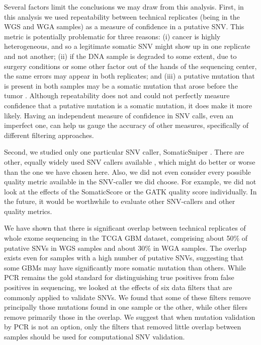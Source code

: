\documentclass[11pt]{article} %
\begin{document}
Several factors limit the conclusions we may draw from this analysis. First, in this analysis we used repeatability between technical replicates (being in the WGS and WGA samples) as a measure of confidence in a putative SNV. This metric is potentially problematic for three reasons: (i) cancer is highly heterogeneous, and so a legitimate somatic SNV might show up in one replicate and not another; (ii) if the DNA sample is degraded to some extent, due to surgery conditions or some other factor out of the hands of the sequencing center, the same errors may appear in both replicates; and (iii) a putative mutation that is present in both samples may be a somatic mutation that arose before the tumor \citep{pre-tumor-muts}. Although repeatability does not and could not perfectly measure confidence that a putative mutation is a somatic mutation, it does make it more likely. Having an independent measure of confidence in SNV calls, even an imperfect one, can help us gauge the accuracy of other measures, specifically of different filtering approaches. 

Second, we studied only one particular SNV caller, SomaticSniper \citep{SomaticSniper}. There are other, equally widely used SNV callers available \citep{MuTect, VarScan, Strelka}, which might do better or worse than the one we have chosen here. Also, we did not even consider every possible quality metric available in the SNV-caller we did choose. For example, we did not look at the effects of the SomaticScore or the GATK quality score individually. In the future, it would be worthwhile to evaluate other SNV-callers and other quality metrics.

We have shown that there is significant overlap between technical replicates of whole exome sequencing in the TCGA GBM dataset, comprising about 50\% of putative SNVs in WGS samples and about 30\% in WGA samples. The overlap exists even for samples with a high number of putative SNVs, suggesting that some GBMs may have significantly more somatic mutation than others. While PCR remains the gold standard for distinguishing true positives from false positives in sequencing, we looked at the effects of six data filters that are commonly applied to validate SNVs. We found that some of these filters remove principally those mutations found in one sample or the other, while other filers remove primarily those in the overlap. We suggest that when mutation validation by PCR is not an option, only the filters that removed little overlap between samples should be used for computational SNV validation.
\end{document}

